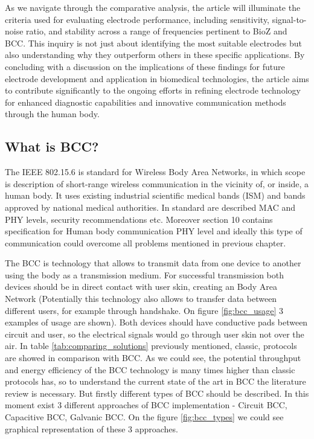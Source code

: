 As we navigate through the comparative analysis, the article will illuminate the criteria used for evaluating electrode performance, including sensitivity, signal-to-noise ratio, and stability across a range of frequencies pertinent to BioZ and BCC. This inquiry is not just about identifying the most suitable electrodes but also understanding why they outperform others in these specific applications. By concluding with a discussion on the implications of these findings for future electrode development and application in biomedical technologies, the article aims to contribute significantly to the ongoing efforts in refining electrode technology for enhanced diagnostic capabilities and innovative communication methods through the human body.
\iffalse
{
\subsection{What is BCC?}
\quad The IEEE 802.15.6 is standard for Wireless Body Area Networks, in which scope is description of short-range wireless communication in the vicinity of, or inside, a human body. It uses existing industrial scientific medical bands (ISM) and bands approved by national medical authorities. In standard are described MAC and PHY levels, security recommendations etc. Moreover section 10 contains specification for Human body communication PHY level and ideally this type of communication could overcome all problems mentioned in previous chapter.

\quad The BCC is technology that allows to transmit data from one device to another using the body as a transmission medium. For successful transmission both devices should be in direct contact with user skin, creating an Body Area Network (Potentially this technology also allows to transfer data between different users, for example through handshake. On figure \ref{fig:bcc_usage} 3 examples of usage are shown). Both devices should have conductive pads between circuit and user, so the electrical signals would go through user skin not over the air. In table \ref{tab:comparing_solutions} previously mentioned, classic, protocols are showed in comparison with BCC. As we could see, the potential throughput and energy efficiency of the BCC technology is many times higher than classic protocols has, so to understand the current state of the art in BCC the literature review is necessary. But firstly different types of BCC should be described. In this moment exist 3 different approaches of BCC implementation - Circuit BCC, Capacitive BCC, Galvanic BCC. On the figure \ref{fig:bcc_types} we could see graphical representation of these 3 approaches.

}
